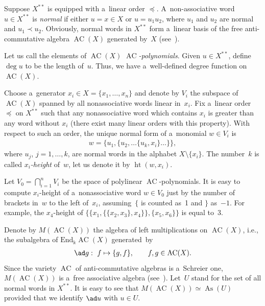 Suppose $X^{**}$ is equipped with a~linear order $\preceq $.
A~non-associative word $u\in X^{**}$ is {\em normal} if either $u=x\in X$ or $u=u_1u_2$, where $u_1$ and $u_2$ are
normal and $u_1\prec u_2$.
Obviously, normal words in $X^{**}$ form a~linear basis of the free anti-commutative algebra $\operatorname{AC}(X)$ generated by~$X$
(see~\cite{BokutCL, ShirshovE}).

Let us call the elements of $\operatorname{AC}(X)$ {\em $\operatorname{AC}$-polynomials}.
Given $u\in X^{**}$, def\/ine $\deg u$ to be the length of~$u$.
Thus, we have a~well-def\/ined degree function on $\operatorname{AC}(X)$.

Choose a~generator $x_i\in X=\{x_1,\dots, x_n\}$ and denote by $V_i$ the subspace of $\operatorname{AC}(X)$ spanned by all
nonassociative words linear in~$x_i$.
Fix a~linear order $\preceq $ on $X^{**}$ such that any nonassociative word which contains $x_i$ is greater than any
word without $x_i$ (there exist many linear orders with this property).
With respect to such an order, the unique normal form of a~monomial $w\in V_i$ is
\begin{gather}
\label{eq:Normal-i-Form}
w = \{u_1, \{u_2, \dots \{u_k, x_i\}\dots\}\},
\end{gather}
where $u_j$, $j=1,\dots, k$, are normal words in the alphabet $X\setminus \{x_i\}$.
The number~$k$ is called {\em $x_i$-height} \cite{FarkasI} of~$w$, let us denote it by $\operatorname{ht}(w, x_i)$.

Let $V_0 = \bigcap\limits_{i=1}^n V_i$ be the space of polylinear $\operatorname{AC}$-polynomials.
It is easy to compute $x_i$-height of a~nonassociative word $w\in V_0$ just by the number of brackets in~$w$ to the left
of~$x_i$, assuming~$\{$ is counted as~1 and $\}$ as~$-1$.
For example, the $x_4$-height of $\{\{x_1, \{\{x_2, x_3\},x_4\} \},\{x_5,x_6\}\}$ is equal to~3.

Denote by $M(\operatorname{AC}(X))$ the algebra of left multiplications on $\operatorname{AC}(X)$, i.e., the subalgebra of $\mathrm{End}_\Bbbk
\operatorname{AC}(X)$ generated~by
\begin{gather*}
\ad g:  \ f\mapsto \{g,f\},
\qquad
f,g\in \operatorname{AC}(X).
\end{gather*}
Since the variety $\operatorname{AC}$ of anti-commutative algebras is a~Schreier one, $M(\operatorname{AC}(X))$ is a~free associative algebra
(see~\cite{Umirbaev1994}).
Let~$U$ stand for the set of all normal words in $X^{**}$.
It is easy to see that $M(\operatorname{AC}(X)) \simeq  \operatorname{As}(U)$ provided that we identify $\ad u$ with $u\in U$.

